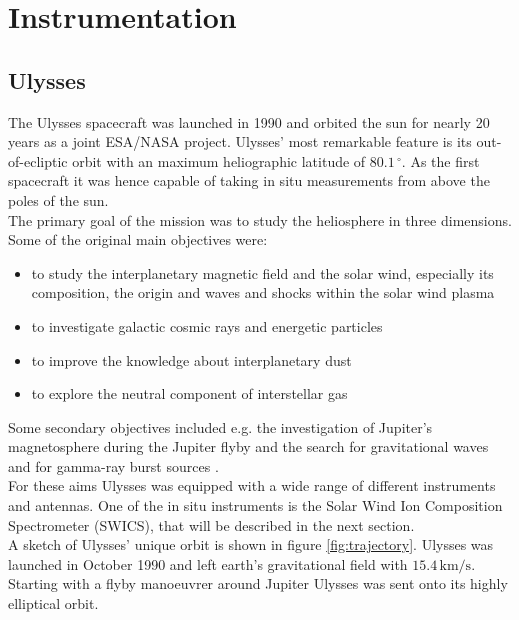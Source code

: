 
\chapter{Instrumentation} %

\label{ChapterInstrumentation} 



\section{Ulysses}
\label{sec:ulysses}
The Ulysses spacecraft \citep{wenzel_ulysses} was launched in 1990 and orbited the sun for nearly 20 years as a joint ESA/NASA project.
Ulysses' most remarkable feature is its out-of-ecliptic orbit with an maximum heliographic latitude of $80.1\,^\circ$.
As the first spacecraft it was hence capable of taking in situ measurements from above the poles of the sun.\\
The primary goal of the mission was to study the heliosphere in three dimensions. Some of the original main objectives were:
\begin{itemize}
	\item to study the interplanetary magnetic field and the solar wind, especially its composition, the origin and waves and shocks within the solar wind plasma
	\item to investigate galactic cosmic rays and energetic particles
	\item to improve the knowledge about interplanetary dust
	\item to explore the neutral component of interstellar gas
\end{itemize}
Some secondary objectives included e.g. the investigation of Jupiter's magnetosphere during the Jupiter flyby and the search for gravitational waves and for gamma-ray burst sources \citep{wenzel_ulysses}.
\\
For these aims Ulysses was equipped with a wide range of different instruments and antennas. One of the in situ instruments is the Solar Wind Ion Composition Spectrometer (SWICS), that will be described in the next section.\\
A sketch of Ulysses' unique orbit is shown in figure \ref{fig:trajectory}.
Ulysses was launched in October 1990 and left earth's gravitational field with $15.4\,\mathrm{km/s}$. Starting with a flyby manoeuvrer around Jupiter Ulysses was sent onto its highly elliptical orbit.
